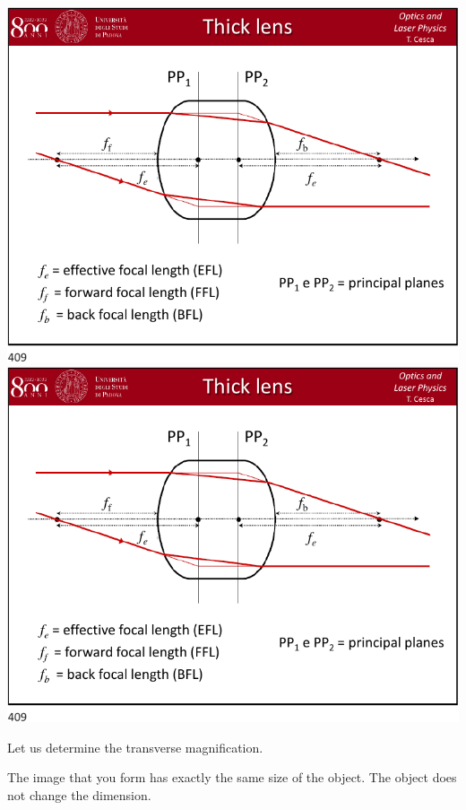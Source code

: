 \documentclass[../main/main.tex]{subfiles}
\begin{document}
\begin{minipage}[]{0.5\linewidth}
\centering
\includegraphics[page=15,width=1\textwidth]{../lessons/pdf_file/20_lecture.pdf}
\centering
\includegraphics[page=16,width=1\textwidth]{../lessons/pdf_file/20_lecture.pdf}
\end{minipage}
\hspace{0.3cm}\vspace{0.3cm}
\begin{minipage}[c]{0.47\linewidth}

Let us determine the transverse magnification.

The image that you form has exactly the same size of the object. The object does not change the dimension.


\end{minipage}
\end{document}
